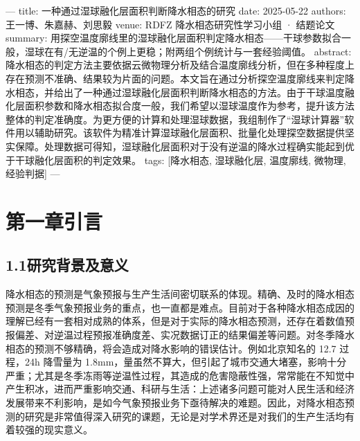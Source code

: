 ---
title: 一种通过湿球融化层面积判断降水相态的研究
date: 2025-05-22
authors: 王一博、朱嘉赫、刘思毅
venue: RDFZ 降水相态研究性学习小组 · 结题论文
summary: 用探空温度廓线里的湿球融化层面积判定降水相态——干球参数拟合一般，湿球在有/无逆温的个例上更稳；附两组个例统计与一套经验阈值。
abstract: 降水相态的判定方法主要依据云微物理分析及结合温度廓线分析，但在多种程度上存在预测不准确、结果较为片面的问题。本文旨在通过分析探空温度廓线来判定降水相态，并给出了一种通过湿球融化层面积判断降水相态的方法。由于干球温度融化层面积参数和降水相态拟合度一般，我们希望以湿球温度作为参考，提升该方法整体的判定准确度。为更方便的计算和处理湿球数据，我组制作了“湿球计算器”软件用以辅助研究。该软件为精准计算湿球融化层面积、批量化处理探空数据提供坚实保障。处理数据可得知，湿球融化层面积对于没有逆温的降水过程确实能起到优于干球融化层面积的判定效果。
tags: [降水相态, 湿球融化层, 温度廓线, 微物理, 经验判据]
---
\section*{第一章\quad 引言}

\subsection*{1.1\quad 研究背景及意义}

降水相态的预测是气象预报与生产生活间密切联系的体现。精确、及时的降水相态预测是冬季气象预报业务的重点，也一直都是难点。目前对于各种降水相态成因的理解已经有一套相对成熟的体系，但是对于实际的降水相态预测，还存在着数值预报偏差、对逆温过程预报准确度差、实况数据订正的结果偏差等问题。对冬季降水相态的预测不够精确，将会造成对降水影响的错误估计。例如北京知名的 12.7 过程，24h 降雪量为 1.8mm，量虽然不算大，但引起了城市交通大堵塞，影响十分严重；尤其是冬季冻雨等逆温性过程，其造成的危害隐蔽性强，常常能在不知觉中产生积冰，进而严重影响交通、科研与生活：上述诸多问题可能对人民生活和经济发展带来不利影响，是如今气象预报业务下亟待解决的难题。因此，对降水相态预测的研究是非常值得深入研究的课题，无论是对学术界还是对我们的生产生活均有着较强的现实意义。

